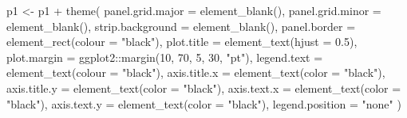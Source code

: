 \documentclass[
  11pt,
  oneside]{book}
\newenvironment{Shaded}{\begin{snugshade}}{\end{snugshade}}
\newcommand{\AttributeTok}[1]{\textcolor[rgb]{0.77,0.63,0.00}{#1}}
\newcommand{\DecValTok}[1]{\textcolor[rgb]{0.00,0.00,0.81}{#1}}
\newcommand{\FloatTok}[1]{\textcolor[rgb]{0.00,0.00,0.81}{#1}}
\newcommand{\FunctionTok}[1]{\textcolor[rgb]{0.00,0.00,0.00}{#1}}
\newcommand{\NormalTok}[1]{#1}
\newcommand{\OtherTok}[1]{\textcolor[rgb]{0.56,0.35,0.01}{#1}}
\newcommand{\SpecialCharTok}[1]{\textcolor[rgb]{0.00,0.00,0.00}{#1}}
\newcommand{\StringTok}[1]{\textcolor[rgb]{0.31,0.60,0.02}{#1}}
\begin{document}
\begin{Shaded}
\begin{Highlighting}[]
\NormalTok{p1 }\OtherTok{\textless{}{-}}\NormalTok{ p1 }\SpecialCharTok{+} \FunctionTok{theme}\NormalTok{(}
  \AttributeTok{panel.grid.major =} \FunctionTok{element\_blank}\NormalTok{(),}
  \AttributeTok{panel.grid.minor =} \FunctionTok{element\_blank}\NormalTok{(),}
  \AttributeTok{strip.background =} \FunctionTok{element\_blank}\NormalTok{(),}
  \AttributeTok{panel.border =} \FunctionTok{element\_rect}\NormalTok{(}\AttributeTok{colour =} \StringTok{"black"}\NormalTok{),}
  \AttributeTok{plot.title =} \FunctionTok{element\_text}\NormalTok{(}\AttributeTok{hjust =} \FloatTok{0.5}\NormalTok{),}
  \AttributeTok{plot.margin =}\NormalTok{ ggplot2}\SpecialCharTok{::}\FunctionTok{margin}\NormalTok{(}\DecValTok{10}\NormalTok{, }\DecValTok{70}\NormalTok{, }\DecValTok{5}\NormalTok{, }\DecValTok{30}\NormalTok{, }\StringTok{"pt"}\NormalTok{),}
  \AttributeTok{legend.text =} \FunctionTok{element\_text}\NormalTok{(}\AttributeTok{colour =} \StringTok{"black"}\NormalTok{),}
  \AttributeTok{axis.title.x =} \FunctionTok{element\_text}\NormalTok{(}\AttributeTok{color =} \StringTok{"black"}\NormalTok{),}
  \AttributeTok{axis.title.y =} \FunctionTok{element\_text}\NormalTok{(}\AttributeTok{color =} \StringTok{"black"}\NormalTok{),}
  \AttributeTok{axis.text.x =} \FunctionTok{element\_text}\NormalTok{(}\AttributeTok{color =} \StringTok{"black"}\NormalTok{),}
  \AttributeTok{axis.text.y =} \FunctionTok{element\_text}\NormalTok{(}\AttributeTok{color =} \StringTok{"black"}\NormalTok{),}
  \AttributeTok{legend.position =} \StringTok{"none"}
\NormalTok{)}
\end{Highlighting}
\end{Shaded}
\end{document}
